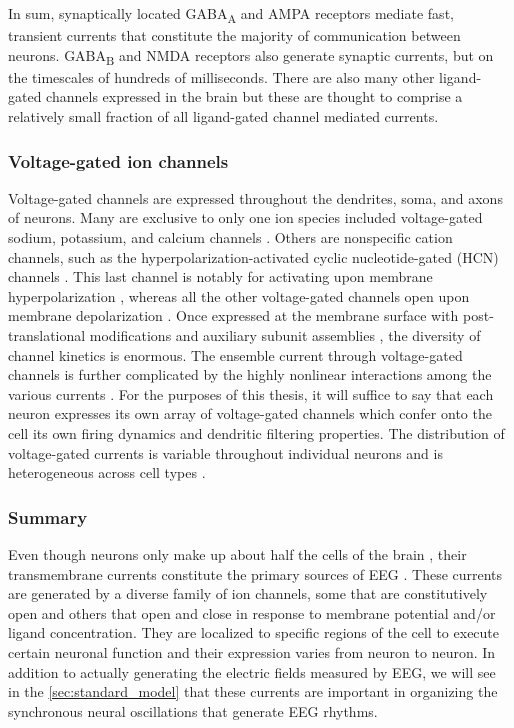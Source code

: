 In sum, synaptically located GABA\textsubscript{A} and AMPA receptors mediate fast, transient currents that constitute the majority of communication between neurons. GABA\textsubscript{B} and NMDA receptors also generate synaptic currents, but on the timescales of hundreds of milliseconds. There are also many other ligand-gated channels expressed in the brain but these are thought to comprise a relatively small fraction of all ligand-gated channel mediated currents.

\subsubsection{Voltage-gated ion channels} \label{sec:I_V}
Voltage-gated channels are expressed throughout the dendrites, soma, and axons of neurons. Many are exclusive to only one ion species included voltage-gated sodium, potassium, and calcium channels \cite{hille1992ionic}. Others are nonspecific cation channels, such as the hyperpolarization-activated cyclic nucleotide-gated (HCN) channels \cite{He2014}. This last channel is notably for activating upon membrane hyperpolarization \cite{He2014}, whereas all the other voltage-gated channels open upon membrane depolarization \cite{hille1992ionic}. Once expressed at the membrane surface with post-translational modifications \cite{Schulz2008} and auxiliary subunit assemblies \cite{Isom1994}, the diversity of channel kinetics is enormous. The ensemble current through voltage-gated channels is further complicated by the highly nonlinear interactions among the various currents \cite{Izhikevich2006}. For the purposes of this thesis, it will suffice to say that each neuron expresses its own array of voltage-gated channels which confer onto the cell its own firing dynamics and dendritic filtering properties. The distribution of voltage-gated currents is variable throughout individual neurons \cite{Lai2006} and is heterogeneous across cell types \cite{Berg2021,Scala2021}.

\subsubsection{Summary}
Even though neurons only make up about half the cells of the brain \cite{Azevedo2009}, their transmembrane currents constitute the primary sources of EEG \cite{Buzsaki2012}. These currents are generated by a diverse family of ion channels, some that are constitutively open and others that open and close in response to membrane potential and/or ligand concentration. They are localized to specific regions of the cell to execute certain neuronal function and their expression varies from neuron to neuron. In addition to actually generating the electric fields measured by EEG, we will see in the \autoref{sec:standard_model} that these currents are important in organizing the synchronous neural oscillations that generate EEG rhythms.

